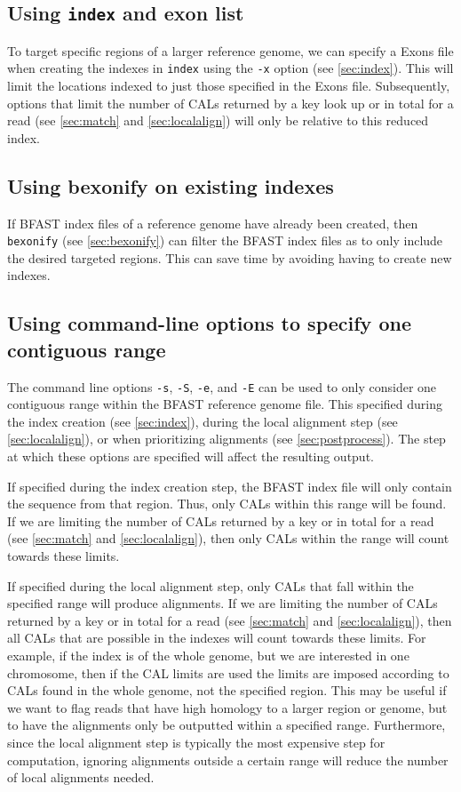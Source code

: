 \documentclass[a4paper,12pt]{book}
\newcommand{\TT}[1]{{\tt #1}} %
\newcommand{\BRGF}{BFAST reference genome file} %
\newcommand{\BIF}{BFAST index file} %
\begin{document}
\subsection{Using \TT{index} and exon list}
\label{sec:using-exon-list}
To target specific regions of a larger reference genome, we can specify a Exons file when creating the indexes in \TT{index} using the \TT{-x} option (see \autoref{sec:index}). 
This will limit the locations indexed to just those specified in the Exons file.
Subsequently, options that limit the number of CALs returned by a key look up or in total for a read (see \autoref{sec:match} and \autoref{sec:localalign}) will only be relative to this reduced index.

\subsection{Using bexonify on existing indexes}
\label{sec:using-bexonify}
If \BIF{s} of a reference genome have already been created, then \TT{bexonify} (see \autoref{sec:bexonify}) can filter the \BIF{s} as to only include the desired targeted regions. 
This can save time by avoiding having to create new indexes.
\subsection{Using command-line options to specify one contiguous range}
The command line options \TT{-s}, \TT{-S}, \TT{-e}, and \TT{-E} can be used to only consider one contiguous range within the \BRGF{}.
This specified during the index creation (see \autoref{sec:index}), during the local alignment step (see \autoref{sec:localalign}), or when prioritizing alignments (see \autoref{sec:postprocess}). 
The step at which these options are specified will affect the resulting output.

If specified during the index creation step, the \BIF{} will only contain the sequence from that region.
Thus, only CALs within this range will be found.
If we are limiting the number of CALs returned by a key or in total for a read (see \autoref{sec:match} and \autoref{sec:localalign}), then only CALs within the range will count towards these limits.

If specified during the local alignment step, only CALs that fall within the specified range will produce alignments.
If we are limiting the number of CALs returned by a key or in total for a read (see \autoref{sec:match} and \autoref{sec:localalign}), then all CALs that are possible in the indexes will count towards these limits.
For example, if the index is of the whole genome, but we are interested in one chromosome, then if the CAL limits are used the limits are imposed according to CALs found in the whole genome, not the specified region.
This may be useful if we want to flag reads that have high homology to a larger region or genome, but to have the alignments only be outputted within a specified range.
Furthermore, since the local alignment step is typically the most expensive step for computation, ignoring alignments outside a certain range will reduce the number of local alignments needed.
\end{document}
